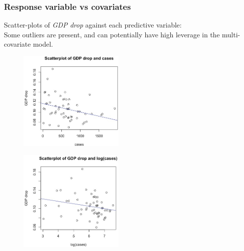 \documentclass{article}
\begin{document}
\subsubsection{Response variable vs covariates}
\noindent Scatter-plots of \textit{GDP drop} against each predictive variable:\\
Some outliers are present, and can potentially have high leverage in the multi-covariate model.
\begin{figure}[H]
\begin{minipage}{.5\textwidth}
  \centering
  \includegraphics[width= 5.1cm]{cases.jpg}
  \label{fig:case}
\end{minipage}%
\begin{minipage}{.5\textwidth}
  \centering
  \includegraphics[width= 5.1cm]{cases2.jpg}
  \label{fig:log(case)}
\end{minipage}%
\end{figure}
\end{document}
